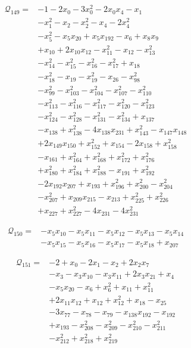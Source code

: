 \begin{align*}
\mathcal{Q}_{149}={}&-1-2x_{0}-3x_{0}^{2}-2x_{0}x_{4}-x_{1}\\
&-x_{1}^{2}-x_{2}-x_{2}^{2}-x_{4}-2x_{4}^{2}\\
&-x_{5}^{2}-x_{5}x_{20}+x_{5}x_{192}-x_{6}+x_{8}x_{9}\\
&+x_{10}+2x_{10}x_{12}-x_{11}^{2}-x_{12}-x_{13}^{2}\\
&-x_{14}^{2}-x_{15}^{2}-x_{16}^{2}-x_{17}^{2}+x_{18}\\
&-x_{18}^{2}-x_{19}-x_{19}^{2}-x_{26}-x_{98}^{2}\\
&-x_{99}^{2}-x_{103}^{2}-x_{104}^{2}-x_{107}^{2}-x_{110}^{2}\\
&-x_{113}^{2}-x_{116}^{2}-x_{117}^{2}-x_{120}^{2}-x_{123}^{2}\\
&-x_{124}^{2}-x_{128}^{2}-x_{131}^{2}-x_{134}^{2}+x_{137}\\
&-x_{138}+x_{138}^{2}-4x_{138}x_{231}+x_{143}^{2}-x_{147}x_{148}\\
&+2x_{149}x_{150}+x_{152}^{2}+x_{154}-2x_{158}+x_{158}^{2}\\
&-x_{161}+x_{164}^{2}+x_{168}^{2}+x_{172}^{2}+x_{176}^{2}\\
&+x_{180}^{2}+x_{184}^{2}+x_{188}^{2}-x_{191}+x_{192}^{2}\\
&-2x_{192}x_{207}+x_{193}+x_{196}^{2}+x_{200}^{2}-x_{204}^{2}\\
&-x_{207}^{2}+x_{209}x_{215}-x_{213}+x_{225}^{2}+x_{226}^{2}\\
&+x_{227}+x_{227}^{2}-4x_{231}-4x_{231}^{2}
\end{align*}

\begin{align*}
\mathcal{Q}_{150}={}&-x_{5}x_{10}-x_{5}x_{11}-x_{5}x_{12}-x_{5}x_{13}-x_{5}x_{14}\\
&-x_{5}x_{15}-x_{5}x_{16}-x_{5}x_{17}-x_{5}x_{18}+x_{207}
\end{align*}

\begin{align*}
\mathcal{Q}_{151}={}&-2+x_{0}-2x_{1}-x_{2}+2x_{2}x_{7}\\
&-x_{3}-x_{3}x_{10}-x_{3}x_{11}+2x_{3}x_{21}+x_{4}\\
&-x_{5}x_{20}-x_{6}+x_{6}^{2}+x_{11}+x_{11}^{2}\\
&+2x_{11}x_{12}+x_{12}+x_{12}^{2}+x_{18}-x_{25}\\
&-3x_{77}-x_{78}-x_{79}-x_{138}x_{192}-x_{192}\\
&+x_{193}-x_{208}^{2}-x_{209}^{2}-x_{210}^{2}-x_{211}^{2}\\
&-x_{212}^{2}+x_{218}^{2}+x_{219}^{2}
\end{align*}

